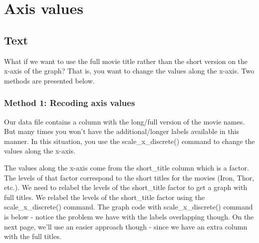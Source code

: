 \documentclass[
]{krantz}
\begin{document}
\hypertarget{axis-values}{%
\section{Axis values}\label{axis-values}}

\hypertarget{text}{%
\subsection{Text}\label{text}}

What if we want to use the full movie title rather than the short version on the x-axis of the graph? That is, you want to change the values along the x-axis. Two methods are presented below.

\hypertarget{method-1-recoding-axis-values}{%
\subsubsection{Method 1: Recoding axis values}\label{method-1-recoding-axis-values}}

Our data file contains a column with the long/full version of the movie names. But many times you won't have the additional/longer labels available in this manner. In this situation, you use the scale\_x\_discrete() command to change the values along the x-axis.

The values along the x-axis come from the short\_title column which is a factor. The levels of that factor correspond to the short titles for the movies (Iron, Thor, etc.). We need to relabel the levels of the short\_title factor to get a graph with full titles. We relabel the levels of the short\_title factor using the scale\_x\_discrete() command. The graph code with scale\_x\_discrete() command is below - notice the problem we have with the labels overlapping though. On the next page, we'll use an easier approach though - since we have an extra column with the full titles.
\end{document}
